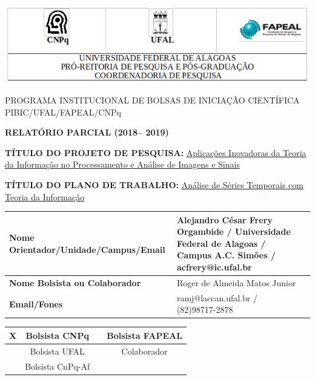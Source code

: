 \documentclass{article}
\begin{document}
\includegraphics[width=1.0\columnwidth]{tabela1.png}

\begin{center}
PROGRAMA INSTITUCIONAL DE BOLSAS DE INICIAÇÃO CIENTÍFICA
PIBIC/UFAL/FAPEAL/CNPq

\vspace{7mm}
\textbf{RELATÓRIO PARCIAL (2018– 2019)}
\end{center}
   
\vspace{6mm}
   
\begin{flushleft}
\textbf{TÍTULO DO PROJETO DE PESQUISA:}
\underline{Aplicações Inovadoras da Teoria da Informação no Processamento e Análise de Imagens e Sinais}
\vspace{5mm}


\textbf{TÍTULO DO PLANO DE TRABALHO:}
\underline{Análise de Séries Temporais com Teoria da Informação}
\vspace{5mm}
    
\begin{table}[!h]
\begin{center}
\begin{tabularx}{\textwidth}{|X|X|X|}
\hline                              
\textbf{Nome Orientador/Unidade/Campus/Email} &  Alejandro César Frery Orgambide / Universidade Federal de Alagoas / Campus A.C. Simões / acfrery@ic.ufal.br\\
\hline     
\textbf{Nome Bolsista ou Colaborador} & Roger de Almeida Matos Junior\\
\hline     
\textbf{Email/Fones} & ramj@laccan.ufal.br / (82)98717-2878\\
\hline     
\end{tabularx}
\end{center}
\end{table}
\end{flushleft}
    
\begin{center}
\begin{tabular}{|c|c|c|c|}
\hline
X & Bolsista CNPq & & Bolsista FAPEAL\\
\hline
 & Bolsista UFAL & & Colaborador\\
\hline
 & Bolsista CnPq-Af & & \\
\hline
\end{tabular}
\end{center}
  
\end{document}
